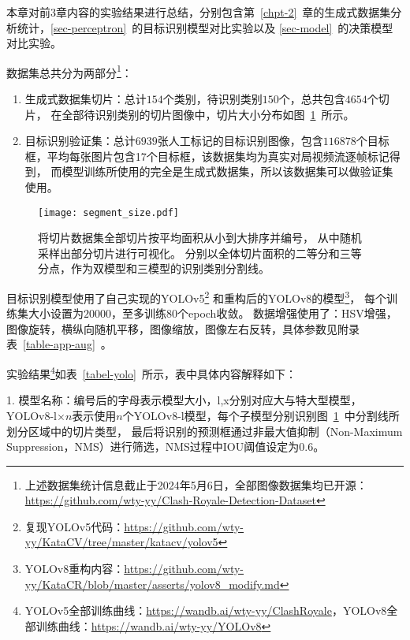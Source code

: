 
\label{sec-5}
本章对前3章内容的实验结果进行总结，分别包含第~\ref{chpt-2}~章的生成式数据集分析统计，\ref{sec-perceptron}~的目标识别模型对比实验以及
\ref{sec-model}~的决策模型对比实验。

\label{sec-exp-data}
数据集总共分为两部分\footnote{上述数据集统计信息截止于2024年5月6日，全部图像数据集均已开源：
\url{https://github.com/wty-yy/Clash-Royale-Detection-Dataset}}：
\begin{enumerate}
  \item 生成式数据集切片：总计$154$个类别，待识别类别$150$个，总共包含$4654$个切片，
  在全部待识别类别的切片图像中，切片大小分布如图~\ref{fig-segment}~所示。
  \item 目标识别验证集：总计$6939$张人工标记的目标识别图像，包含$116878$个目标框，平均每张图片包含17个目标框，该数据集均为真实对局视频流逐帧标记得到，
  而模型训练所使用的完全是生成式数据集，所以该数据集可以做验证集使用。
\end{enumerate}

\begin{figure}[htbp]
  \centering
  \texttt{[image: segment\_size.pdf]}
  \caption{将切片数据集全部切片按平均面积从小到大排序并编号，
  从中随机采样出部分切片进行可视化。
  分别以全体切片面积的二等分和三等分点，作为双模型和三模型的识别类别分割线。
  }
  \label{fig-segment}
\end{figure}

\label{sec-exp-detect}
目标识别模型使用了自己实现的YOLOv5\footnote{复现YOLOv5代码：\url{https://github.com/wty-yy/KataCV/tree/master/katacv/yolov5}}
和重构后的YOLOv8的模型\footnote{YOLOv8重构内容：\url{https://github.com/wty-yy/KataCR/blob/master/asserts/yolov8_modify.md}}，
每个训练集大小设置为$20000$，至多训练$80$个epoch收敛。
数据增强使用了：HSV增强，图像旋转，横纵向随机平移，图像缩放，图像左右反转，具体参数见附录表~\ref{table-app-aug}~。

实验结果\footnote{YOLOv5全部训练曲线：\url{https://wandb.ai/wty-yy/ClashRoyale}，YOLOv8全部训练曲线：\url{https://wandb.ai/wty-yy/YOLOv8}}如表~\ref{tabel-yolo}~所示，表中具体内容解释如下：

1. 模型名称：编号后的字母表示模型大小，l,x分别对应大与特大型模型，
YOLOv8-l$\times n$表示使用$n$个YOLOv8-l模型，每个子模型分别识别图~\ref{fig-segment}~中分割线所划分区域中的切片类型，
最后将识别的预测框通过非最大值抑制（Non-Maximum Suppression，NMS）进行筛选，NMS过程中IOU阈值设定为0.6。

